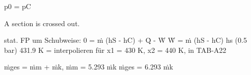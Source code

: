 p0 = pC

A section is crossed out.

stat. FP um Schubweise: 0 = ṁ (hS - hC) + Q̇ - Ẇ
Ẇ = ṁ (hS - hC)
hs (0.5 bar) 431.9 K = interpolieren für x1 = 430 K, x2 = 440 K, in TAB-A22

ṁges = ṁm + ṁk, ṁm = 5.293 ṁk
ṁges = 6.293 ṁk